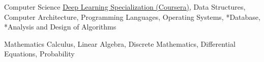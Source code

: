 

\begin{cvskills}

  \cvskill
    {Computer Science} %
    {{\href{https://www.coursera.org/specializations/deep-learning}{Deep Learning Specialization (Coursera)}}, Data Structures, Computer Architecture, Programming Languages, \newline *Operating Systems, *Database, *Analysis and Design of Algorithms} %


  \cvskill
    {Mathematics} %
    {Calculus, Linear Algebra, Discrete Mathematics, Differential Equations, Probability} %




\end{cvskills}

